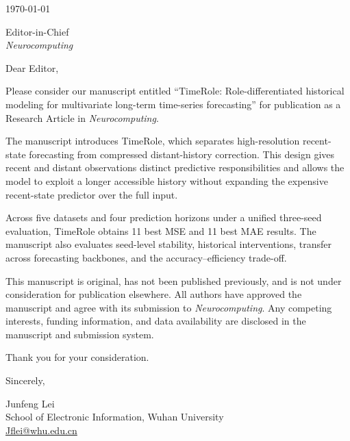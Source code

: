 \documentclass[11pt]{article}
\begin{document}
\today

Editor-in-Chief\\
\textit{Neurocomputing}

Dear Editor,

Please consider our manuscript entitled ``TimeRole: Role-differentiated
historical modeling for multivariate long-term time-series forecasting'' for
publication as a Research Article in \textit{Neurocomputing}.

The manuscript introduces TimeRole, which separates high-resolution recent-state
forecasting from compressed distant-history correction. This design gives recent
and distant observations distinct predictive responsibilities and allows the model
to exploit a longer accessible history without expanding the expensive recent-state
predictor over the full input.

Across five datasets and four prediction horizons under a unified three-seed
evaluation, TimeRole obtains 11 best MSE and 11 best MAE results. The manuscript
also evaluates seed-level stability, historical interventions, transfer across
forecasting backbones, and the accuracy--efficiency trade-off.

This manuscript is original, has not been published previously, and is not under
consideration for publication elsewhere. All authors have approved the manuscript
and agree with its submission to \textit{Neurocomputing}. Any competing interests,
funding information, and data availability are disclosed in the manuscript and
submission system.

Thank you for your consideration.

Sincerely,

Junfeng Lei\\
School of Electronic Information, Wuhan University\\
\href{mailto:Jflei@whu.edu.cn}{Jflei@whu.edu.cn}
\end{document}
